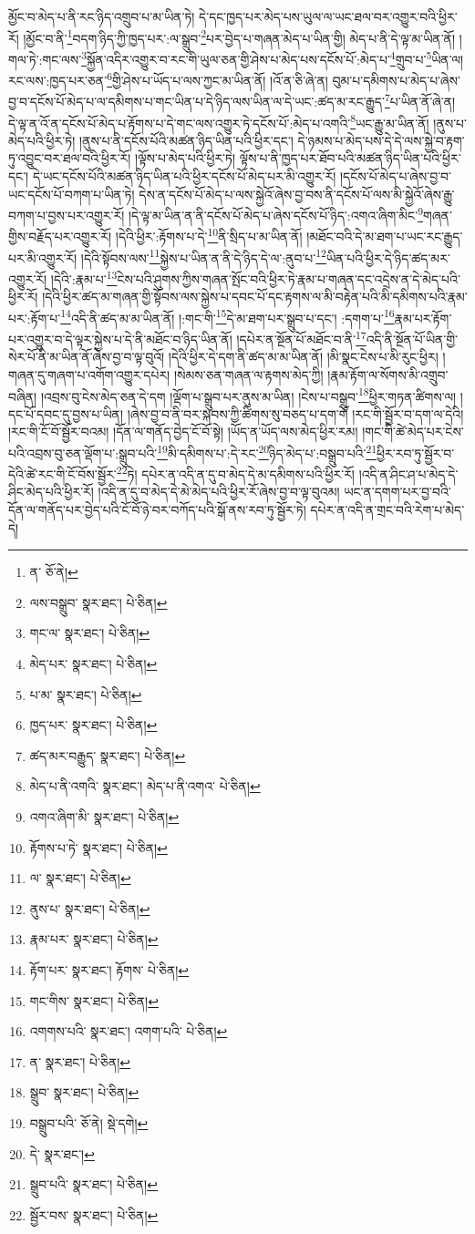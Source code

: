 མྱོང་བ་མེད་པ་ནི་རང་ཉིད་འགྲུབ་པ་མ་ཡིན་ཏེ། དེ་དང་ཁྱད་པར་མེད་པས་ཡུལ་ལ་ཡང་ཐལ་བར་འགྱུར་བའི་ཕྱིར་རོ། །མྱོང་བ་ནི་\footnote{ན་  ཅོ་ནེ། }བདག་ཉིད་ཀྱི་ཁྱད་པར་:ལ་སྒྲུབ་\footnote{ལས་བསྒྲུབ་  སྣར་ཐང་།  པེ་ཅིན། }པར་བྱེད་པ་གཞན་མེད་པ་ཡིན་གྱི། མེད་པ་ནི་དེ་ལྟ་མ་ཡིན་ནོ། །གལ་ཏེ་:གང་ལས་\footnote{གང་ལ་  སྣར་ཐང་།  པེ་ཅིན། }སྐྱོན་འདིར་འགྱུར་བ་རང་གི་ཡུལ་ཅན་གྱི་ཤེས་པ་མེད་པས་དངོས་པོ་:མེད་པ་\footnote{མེད་པར་  སྣར་ཐང་།  པེ་ཅིན། }གྲུབ་པ་\footnote{པ་མ་  སྣར་ཐང་།  པེ་ཅིན། }ཡིན་ལ། རང་ལས་:ཁྱད་པར་ཅན་\footnote{ཁྱད་པར་  སྣར་ཐང་།  པེ་ཅིན། }གྱི་ཤེས་པ་ཡོད་པ་ལས་ཀྱང་མ་ཡིན་ནོ། །འོ་ན་ཅི་ཞེ་ན། བུམ་པ་དམིགས་པ་མེད་པ་ཞེས་བྱ་བ་དངོས་པོ་མེད་པ་ལ་དམིགས་པ་གང་ཡིན་པ་དེ་ཉིད་ལས་ཡིན་ལ་དེ་ཡང་:ཚད་མ་རང་རྒྱུད་\footnote{ཚད་མར་བརྒྱུད་  སྣར་ཐང་།  པེ་ཅིན། }པ་ཡིན་ནོ་ཞེ་ན། དེ་ལྟ་ན་འོ་ན་དངོས་པོ་མེད་པ་རྟོགས་པ་དེ་གང་ལས་འགྱུར་ཏེ་དངོས་པོ་:མེད་པ་འགའི་\footnote{མེད་པ་ནི་འགའི་  སྣར་ཐང་། མེད་པ་ནི་འགའ་  པེ་ཅིན། }ཡང་རྒྱུ་མ་ཡིན་ནོ། །ནུས་པ་མེད་པའི་ཕྱིར་ཏེ། །ནུས་པ་ནི་དངོས་པོའི་མཚན་ཉིད་ཡིན་པའི་ཕྱིར་དང་། དེ་ཉམས་པ་མེད་པས་དེ་དེ་ལས་སྐྱེ་བ་རྟག་ཏུ་འབྱུང་བར་ཐལ་བའི་ཕྱིར་རོ། །ལྟོས་པ་མེད་པའི་ཕྱིར་ཏེ། ལྟོས་པ་ནི་ཁྱད་པར་ཐོབ་པའི་མཚན་ཉིད་ཡིན་པའི་ཕྱིར་དང་། དེ་ཡང་དངོས་པོའི་མཚན་ཉིད་ཡིན་པའི་ཕྱིར་དངོས་པོ་མེད་པར་མི་འགྱུར་རོ། །དངོས་པོ་མེད་པ་ཞེས་བྱ་བ་ཡང་དངོས་པོ་བཀག་པ་ཡིན་ཏེ། དེས་ན་དངོས་པོ་མེད་པ་ལས་སྐྱེའོ་ཞེས་བྱ་བས་ནི་དངོས་པོ་ལས་མི་སྐྱེའོ་ཞེས་རྒྱུ་བཀག་པ་བྱས་པར་འགྱུར་རོ། །དེ་ལྟ་མ་ཡིན་ན་ནི་དངོས་པོ་མེད་པ་ཞེས་དངོས་པོ་ཉིད་:འགའ་ཞིག་མིང་\footnote{འགའ་ཞིག་མི་  སྣར་ཐང་།  པེ་ཅིན། }གཞན་གྱིས་བརྗོད་པར་འགྱུར་རོ། །དེའི་ཕྱིར་:རྟོགས་པ་དེ་\footnote{རྟོགས་པ་ཏེ་  སྣར་ཐང་།  པེ་ཅིན། }ནི་སྲིད་པ་མ་ཡིན་ནོ། །མཐོང་བའི་དེ་མ་ཐག་པ་ཡང་རང་རྒྱུད་པར་མི་འགྱུར་རོ། །དེའི་སྟོབས་ལས་\footnote{ལ་  སྣར་ཐང་།  པེ་ཅིན། }སྐྱེས་པ་ཡིན་ན་ནི་དེ་ཉིད་དེ་ལ་:ནུབ་པ་\footnote{ནུས་པ་  སྣར་ཐང་།  པེ་ཅིན། }ཡིན་པའི་ཕྱིར་དེ་ཉིད་ཚད་མར་འགྱུར་རོ། །དེའི་:རྣམ་པ་\footnote{རྣམ་པར་  སྣར་ཐང་།  པེ་ཅིན། }ངེས་པའི་ཤུགས་ཀྱིས་གཞན་སྤོང་བའི་ཕྱིར་ཏེ་རྣམ་པ་གཞན་དང་འདྲེས་ན་དེ་མེད་པའི་ཕྱིར་རོ། །དེའི་ཕྱིར་ཚད་མ་གཞན་གྱི་སྟོབས་ལས་སྐྱེས་པ་དབང་པོ་དང་རྟགས་ལ་མི་བརྟེན་པའི་མི་དམིགས་པའི་རྣམ་པར་:རྟོག་པ་\footnote{རྟོག་པར་  སྣར་ཐང་། རྟོགས་  པེ་ཅིན། }འདི་ནི་ཚད་མ་མ་ཡིན་ནོ། །:གང་གི་\footnote{གང་གིས་  སྣར་ཐང་།  པེ་ཅིན། }དེ་མ་ཐག་པར་སྒྲུབ་པ་དང་། :དགག་པ་\footnote{འགགས་པའི་  སྣར་ཐང་། འགག་པའི་  པེ་ཅིན། }རྣམ་པར་རྟོག་པར་འགྱུར་བ་དེ་ལྟར་སྐྱེས་པ་དེ་ནི་མཐོང་བ་ཉིད་ཡིན་ནོ། །དཔེར་ན་སྔོན་པོ་མཐོང་བ་ནི་\footnote{ན་  སྣར་ཐང་།  པེ་ཅིན། }འདི་ནི་སྔོན་པོ་ཡིན་གྱི་སེར་པོ་ནི་མ་ཡིན་ནོ་ཞེས་བྱ་བ་ལྟ་བུའོ། །དེའི་ཕྱིར་དེ་དག་ནི་ཚད་མ་མ་ཡིན་ནོ། །མི་སྣང་ངེས་པ་མི་རུང་ཕྱིར། །གཞན་དུ་གཞག་པ་འགོག་འགྱུར་དཔེར། །སེམས་ཅན་གཞན་ལ་རྟགས་མེད་ཀྱི། །རྣམ་རྟོག་ལ་སོགས་མི་འགྲུབ་བཞིན། །འབྲས་བུ་ངེས་མེད་ཅན་དེ་དག །ལྡོག་པ་སྒྲུབ་པར་ནུས་མ་ཡིན། །ངེས་པ་བསྒྲུབ་\footnote{སྒྲུབ་  སྣར་ཐང་།  པེ་ཅིན། }ཕྱིར་གཏན་ཚིགས་ལ། །དང་པོ་དབང་དུ་བྱས་པ་ཡིན། །ཞེས་བྱ་བ་ནི་བར་སྐབས་ཀྱི་ཚིགས་སུ་བཅད་པ་དག་གོ །རང་གི་སྦྱོར་བ་དག་ལ་དེའི། །རང་གི་ངོ་བོ་སྦྱོར་བའམ། །དོན་ལ་གནོད་བྱེད་ངོ་བོ་སྟེ། །ཡོད་ན་ཡོད་ལས་མེད་ཕྱིར་རམ། །གང་གི་ཚེ་མེད་པར་ངེས་པའི་འབྲས་བུ་ཅན་ལྡོག་པ་:སྒྲུབ་པའི་\footnote{བསྒྲུབ་པའི་  ཅོ་ནེ།  སྡེ་དགེ། }མི་དམིགས་པ་:དེ་རང་\footnote{དེ་  སྣར་ཐང་། }ཉིད་མེད་པ་:བསྒྲུབ་པའི་\footnote{སྒྲུབ་པའི་  སྣར་ཐང་།  པེ་ཅིན། }ཕྱིར་རབ་ཏུ་སྦྱོར་བ་དེའི་ཚེ་རང་གི་ངོ་བོས་སྦྱོར་\footnote{སྦྱོར་བས་  སྣར་ཐང་།  པེ་ཅིན། }ཏེ། དཔེར་ན་འདི་ན་དུ་བ་མེད་དེ་མ་དམིགས་པའི་ཕྱིར་རོ། །འདི་ན་ཤིང་ཤ་པ་མེད་དེ་ཤིང་མེད་པའི་ཕྱིར་རོ། །འདི་ན་དུ་བ་མེད་དེ་མེ་མེད་པའི་ཕྱིར་རོ་ཞེས་བྱ་བ་ལྟ་བུའམ། ཡང་ན་དགག་པར་བྱ་བའི་དོན་ལ་གནོད་པར་བྱེད་པའི་ངོ་བོ་ཉེ་བར་བཀོད་པའི་སྒོ་ནས་རབ་ཏུ་སྦྱོར་ཏེ། དཔེར་ན་འདི་ན་གྲང་བའི་རེག་པ་མེད་དེ། 